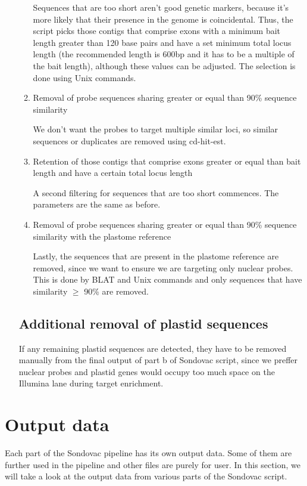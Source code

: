 \begin{enumerate}
\begin{enumerate}
Sequences that are too short aren't good genetic markers, because it's more likely that their presence in the genome is coincidental. Thus, the script picks those contigs that 
comprise exons with a minimum bait length greater than 120 base pairs and have a set minimum total locus length (the recommended length is 600bp and it has to be a multiple of 
the bait length), although these values can be adjusted. The selection is done using Unix commands. 

\item Removal of probe sequences sharing greater or equal than 90\% sequence similarity

We don't want the probes to target multiple similar loci, so similar sequences or duplicates are removed using cd-hit-est. 

\item Retention of those contigs that comprise exons greater or equal than bait length and have a certain total locus length

A second filtering for sequences that are too short commences. The parameters are the same as before. 

\item Removal of probe sequences sharing greater or equal than 90\% sequence similarity with the plastome reference

Lastly, the sequences that are present in the plastome reference are removed, since we want to ensure we are targeting only nuclear probes. This is done by BLAT and Unix commands and 
only sequences that have similarity $\geq$ 90\% are removed. 

\end{enumerate}

\subsection{Additional removal of plastid sequences}

If any remaining plastid sequences are detected, they have to be removed manually from the final output of part b of Sondovac script, since we preffer nuclear probes and 
plastid genes would occupy too much space on the Illumina lane during target enrichment. 

\end{enumerate}

\section{Output data}
Each part of the Sondovac pipeline has its own output data. Some of them are further used in the pipeline and other files are purely for user. In this section, we will 
take a look at the output data from various parts of the Sondovac script. 

